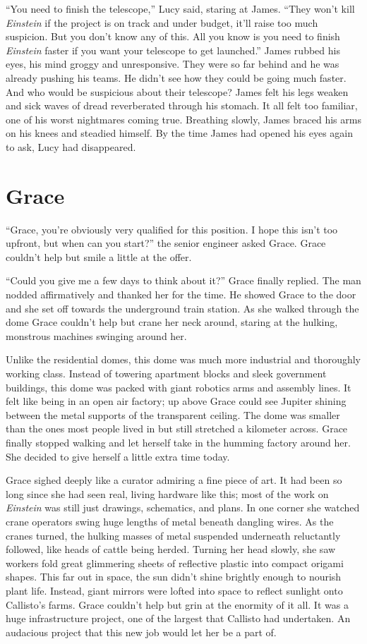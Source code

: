 \documentclass[openany, 12pt]{book} %
\begin{document}
``You need to finish the telescope,'' Lucy said, staring at James. ``They won't kill \textit{Einstein} if the project is on track and under budget, it'll raise too much suspicion. But you don't know any of this. All you know is you need to finish \textit{Einstein} faster if you want your telescope to get launched.'' James rubbed his eyes, his mind groggy and unresponsive. They were so far behind and he was already pushing his teams. He didn't see how they could be going much faster. And who would be suspicious about their telescope? James felt his legs weaken and sick waves of dread reverberated through his stomach. It all felt too familiar, one of his worst nightmares coming true. Breathing slowly, James braced his arms on his knees and steadied himself. By the time James had opened his eyes again to ask, Lucy had disappeared.

\chapter{Grace}

``Grace, you're obviously very qualified for this position. I hope this isn't too upfront, but when can you start?'' the senior engineer asked Grace. Grace couldn't help but smile a little at the offer.

``Could you give me a few days to think about it?'' Grace finally replied. The man nodded affirmatively and thanked her for the time. He showed Grace to the door and she set off towards the underground train station. As she walked through the dome Grace couldn't help but crane her neck around, staring at the hulking, monstrous machines swinging around her. 

Unlike the residential domes, this dome was much more industrial and thoroughly working class. Instead of towering apartment blocks and sleek government buildings, this dome was packed with giant robotics arms and assembly lines. It felt like being in an open air factory; up above Grace could see Jupiter shining between the metal supports of the transparent ceiling. The dome was smaller than the ones most people lived in but still stretched a kilometer across. Grace finally stopped walking and let herself take in the humming factory around her. She decided to give herself a little extra time today.

Grace sighed deeply like a curator admiring a fine piece of art. It had been so long since she had seen real, living hardware like this; most of the work on \textit{Einstein} was still just drawings, schematics, and plans. In one corner she watched crane operators swing huge lengths of metal beneath dangling wires. As the cranes turned, the hulking masses of metal suspended underneath reluctantly followed, like heads of cattle being herded. Turning her head slowly, she saw workers fold great glimmering sheets of reflective plastic into compact origami shapes. This far out in space, the sun didn't shine brightly enough to nourish plant life. Instead, giant mirrors were lofted into space to reflect sunlight onto Callisto's farms. Grace couldn't help but grin at the enormity of it all. It was a huge infrastructure project, one of the largest that Callisto had undertaken. An audacious project that this new job would let her be a part of.
\end{document}
